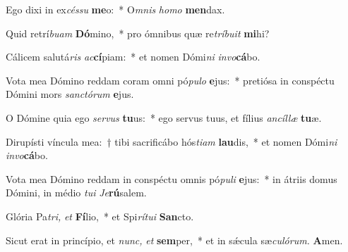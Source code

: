\item Ego dixi in ex\textit{céssu} \textbf{me}o:~* O\textit{mnis} \textit{homo} \textbf{men}dax.
\item Quid retrí\textit{buam} \textbf{Dó}mino,~* pro ómnibus quæ re\textit{tríbuit} \textbf{mi}hi?
\item Cálicem salutá\textit{ris} \textit{ac}\textbf{cí}piam:~* et nomen Dómi\textit{ni} \textit{invo}\textbf{cá}bo.
\item Vota mea Dómino reddam coram omni pó\textit{pulo} \textbf{e}jus:~* pretiósa in conspé\-ctu Dómini mors \textit{sanctórum} \textbf{e}jus.
\item O Dómine quia ego \textit{servus} \textbf{tu}us:~* ego servus tuus, et fílius \textit{ancíllæ} \textbf{tu}æ.
\item Dirupísti víncula mea:~† tibi sacrificábo hós\textit{tiam} \textbf{lau}dis,~* et nomen Dómi\textit{ni} \textit{invo}\textbf{cá}bo.
\item Vota mea Dómino reddam in conspéctu omnis pó\textit{puli} \textbf{e}jus:~* in átriis domus Dómini, in médio \textit{tui} \textit{Je}\textbf{rú}salem.
\item Glória Pa\hspace*{0.03em}\textit{tri,} \textit{et} \textbf{Fí}lio,~* et Spi\hspace*{0.03em}\textit{rítui} \textbf{San}cto.
\item Sicut erat in princípio, et \textit{nunc,} \textit{et} \textbf{sem}per,~* et in sǽcula sæ\hspace*{0.03em}\textit{culórum.} \textbf{A}men.